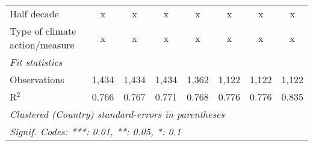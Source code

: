 \begin{table}[htbp]
\begin{tabular}{lccccccc}
      Half decade                                                                               & x       & x       & x            & x             & x             & x             & x\\  
      Type of climate action/measure                                                            & x       & x       & x            & x             & x             & x             & x\\  
      \midrule \emph{Fit statistics}\\
      Observations                                                                              & 1,434   & 1,434   & 1,434        & 1,362         & 1,122         & 1,122         & 1,122\\  
      R$^2$                                                                                     & 0.766   & 0.767   & 0.771        & 0.768         & 0.776         & 0.776         & 0.835\\  
      \midrule
      \multicolumn{8}{l}{\emph{Clustered (Country) standard-errors in parentheses}}\\
      \multicolumn{8}{l}{\emph{Signif. Codes: ***: 0.01, **: 0.05, *: 0.1}}\\
   \end{tabular}
\end{table}


